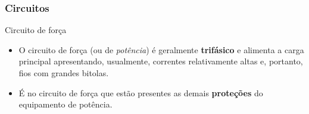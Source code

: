 

\begin{frame}
\frametitle{Circuitos}
\begin{block}{Circuito de força}
	\begin{itemize}
		\item O circuito de força (ou de \textit{potência}) é geralmente \textbf{trifásico} e alimenta a carga principal apresentando, usualmente, correntes relativamente altas e, portanto, fios com grandes bitolas.
		\item É no circuito de força que estão presentes as demais \textbf{proteções} do equipamento de potência.
	\end{itemize}
\end{block}
\end{frame}

